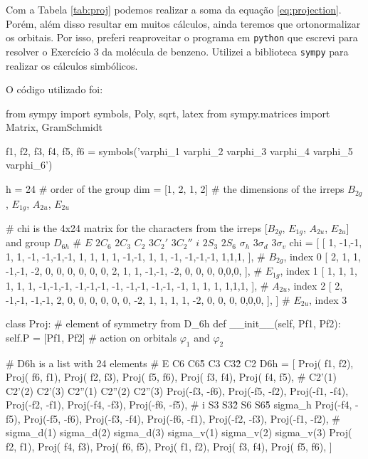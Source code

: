 \documentclass[a4paper,10pt]{article}
\newcommand{\python}[1]{\texttt{#1}}
\begin{document}
Com a Tabela \ref{tab:proj} podemos realizar a soma da equação \ref{eq:projection}. Porém, além disso resultar em muitos cálculos, ainda teremos que ortonormalizar os orbitais. Por isso, preferi reaproveitar o programa em \python{python} que escrevi para resolver o Exercício 3 da molécula de benzeno. Utilizei a biblioteca \python{sympy} para realizar os cálculos simbólicos.

\n

O código utilizado foi:

\begin{Python}
from sympy import symbols, Poly, sqrt, latex
from sympy.matrices import Matrix, GramSchmidt

f1, f2, f3, f4, f5, f6 = symbols('varphi_1 varphi_2 varphi_3 varphi_4 varphi_5 varphi_6')

h = 24  # order of the group
dim = [1, 2, 1, 2]  # the dimensions of the irreps $B_{2g}$, $E_{1g}$, $A_{2u}$, $E_{2u}$

# chi is the 4x24 matrix for the characters from the irreps [$B_{2g}$, $E_{1g}$, $A_{2u}$, $E_{2u}$] and group $D_{6h}$
#         $E$  $2 C_6$    $2 C_3$  $C_2$     $3 C_2'$      $3 C_2''$      $i$    $2 S_3$     $2 S_6$  $\sigma_h$    $3 \sigma_d$     $3 \sigma_v$
chi = [ [ 1, -1,-1,  1, 1, -1,  -1,-1,-1,  1, 1, 1,   1,  -1,-1,   1, 1, -1, -1,-1,-1, 1,1,1, ],     #  $B_{2g}$, index 0
        [ 2,  1, 1, -1,-1, -2,   0, 0, 0,  0, 0, 0,   2,   1, 1,  -1,-1, -2,  0, 0, 0, 0,0,0, ],     #  $E_{1g}$, index 1
        [ 1,  1, 1,  1, 1,  1,  -1,-1,-1, -1,-1,-1,  -1,  -1,-1,  -1,-1, -1,  1, 1, 1, 1,1,1, ],     #  $A_{2u}$, index 2
        [ 2, -1,-1, -1,-1,  2,   0, 0, 0,  0, 0, 0,  -2,   1, 1,   1, 1, -2,  0, 0, 0, 0,0,0, ], ]   #  $E_{2u}$, index 3

class Proj:     # element of symmetry from D\_6h
    def __init__(self, Pf1, Pf2):
        self.P = [Pf1, Pf2]     # action on orbitals $\varphi_1$ and $\varphi_2$

# D6h is a list with 24 elements
#              E               C6             C6\^5            C3            C3\^2             C2
D6h = [ Proj( f1,  f2), Proj( f6,  f1), Proj( f2,  f3), Proj( f5,  f6), Proj( f3,  f4), Proj( f4,  f5),
#            C2'(1)          C2'(2)         C2'(3)         C2''(1)        C2''(2)          C2''(3)
        Proj(-f3, -f6), Proj(-f5, -f2), Proj(-f1, -f4), Proj(-f2, -f1), Proj(-f4, -f3), Proj(-f6, -f5),
#              i              S3             S3\^2             S6           S6\^5            sigma\_h
        Proj(-f4, -f5), Proj(-f5, -f6), Proj(-f3, -f4), Proj(-f6, -f1), Proj(-f2, -f3), Proj(-f1, -f2),
#           sigma\_d(1)     sigma\_d(2)      sigma\_d(3)     sigma\_v(1)      sigma\_v(2)     sigma\_v(3)
        Proj( f2,  f1), Proj( f4,  f3), Proj( f6,  f5), Proj( f1,  f2), Proj( f3,  f4), Proj( f5,  f6),  ]


\end{Python}
\end{document}
